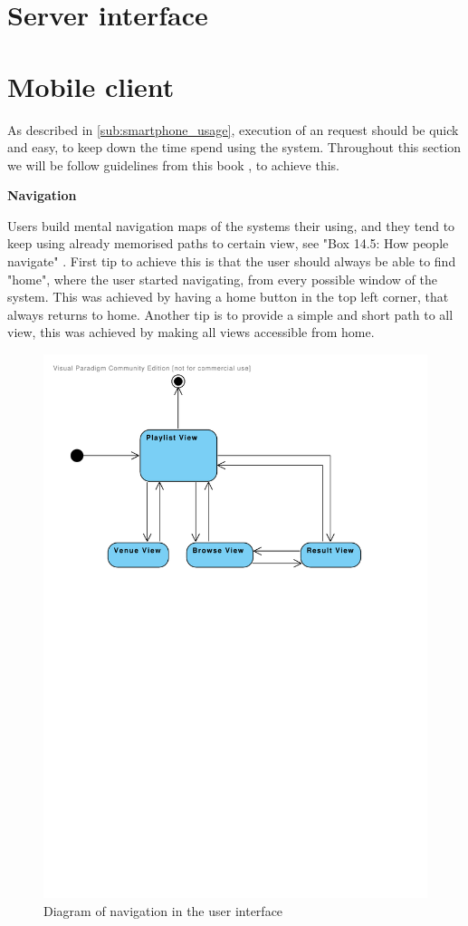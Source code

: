 \section{Server interface}

\section{Mobile client}

As described in \cref{sub:smartphone_usage}, execution of an request should be quick and easy, to keep down the time spend using the system. Throughout this section we will be follow guidelines from this book \cite{DEB}, to achieve this.

\textbf{Navigation}

Users build mental navigation maps of the systems their using, and they tend to keep using already memorised paths to certain view, see "Box 14.5: How people navigate" \cite{DEB}.
First tip to achieve this is that the user should always be able to find "home", where the user started navigating, from every possible window of the system. This was achieved by having a home button in the top left corner, that always returns to home.
Another tip is to provide a simple and short path to all view, this was achieved by making all views accessible from home. 

\begin{figure}
  \centering
  \includegraphics[width=0.5\linewidth]{Images/UserInterface.pdf}
  \caption{Diagram of navigation in the user interface}
  \label{fig:UserInterface}
\end{figure}

